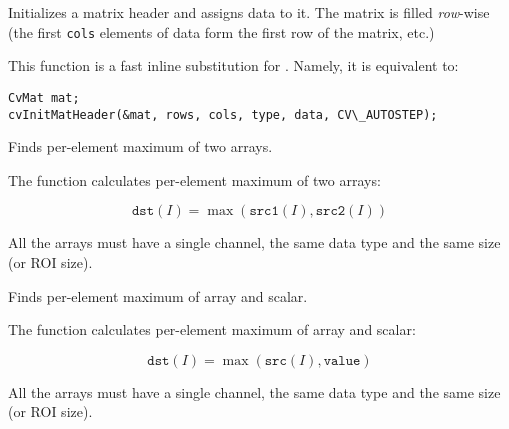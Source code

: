 \begin{description}
\end{description}

Initializes a matrix header and assigns data to it. The matrix is filled \textit{row}-wise (the first \texttt{cols} elements of data form the first row of the matrix, etc.)

This function is a fast inline substitution for . Namely, it is equivalent to:

\begin{lstlisting}
CvMat mat;
cvInitMatHeader(&mat, rows, cols, type, data, CV\_AUTOSTEP);
\end{lstlisting}
\fi

Finds per-element maximum of two arrays.


\begin{description}
\end{description}

The function calculates per-element maximum of two arrays:

\[
\texttt{dst}(I)=\max(\texttt{src1}(I), \texttt{src2}(I))
\]

All the arrays must have a single channel, the same data type and the same size (or ROI size).


Finds per-element maximum of array and scalar.


\begin{description}
\end{description}

The function calculates per-element maximum of array and scalar:

\[
\texttt{dst}(I)=\max(\texttt{src}(I), \texttt{value})
\]

All the arrays must have a single channel, the same data type and the same size (or ROI size).


